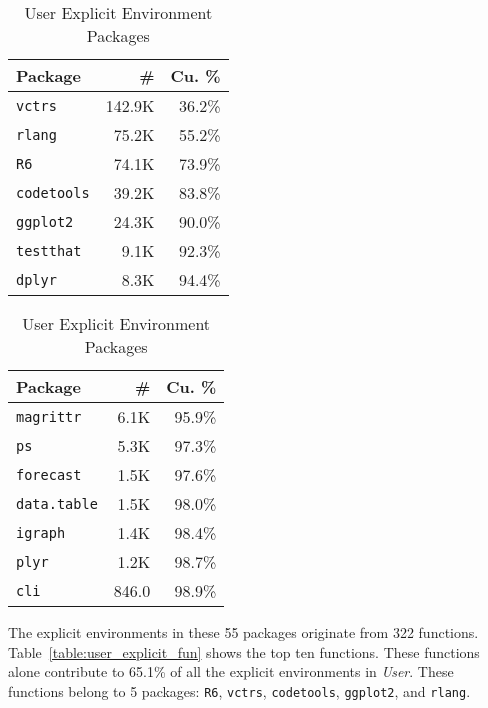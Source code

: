 \documentclass[10pt,review,sigplan,anonymous=true,authorversion=true,nonacm=true]{acmart}
\newcommand{\code}[1]{\lstinline |#1|\xspace}
\begin{document}
\begin{table}[!h]
  \vspace{-3mm}
  \small
  \caption{User Explicit Environment Packages} \label{table:user_explicit_pack}
  \centering
  \begin{tabular}{lrr}
    \toprule
    \textbf{Package}&\textbf{\#}&\textbf{Cu. \%}\\
    \midrule
    \code{vctrs}&142.9K&36.2\%\\
    \code{rlang}&75.2K&55.2\%\\
    \code{R6}&74.1K&73.9\%\\
    \code{codetools}&39.2K&83.8\%\\
    \code{ggplot2}&24.3K&90.0\%\\
    \code{testthat}&9.1K&92.3\%\\
    \code{dplyr}&8.3K&94.4\%\\
    \bottomrule
  \end{tabular}
  \begin{tabular}{lrr}
    \toprule
    \textbf{Package}&\textbf{\#}&\textbf{Cu. \%}\\
    \midrule
    \code{magrittr}&6.1K&95.9\%\\
    \code{ps}&5.3K&97.3\%\\
    \code{forecast}&1.5K&97.6\%\\
    \code{data.table}&1.5K&98.0\%\\
    \code{igraph}&1.4K&98.4\%\\
    \code{plyr}&1.2K&98.7\%\\
    \code{cli}&846.0&98.9\%\\
    \bottomrule
  \end{tabular}
\end{table}

The explicit environments in these 55 packages originate from 322 functions.
Table~\ref{table:user_explicit_fun} shows the top ten functions. These functions
alone contribute to 65.1\% of all the explicit environments in \emph{User}.
These functions belong to 5 packages: \code{R6}, \code{vctrs}, \code{codetools},
\code{ggplot2}, and \code{rlang}.
\end{document}
